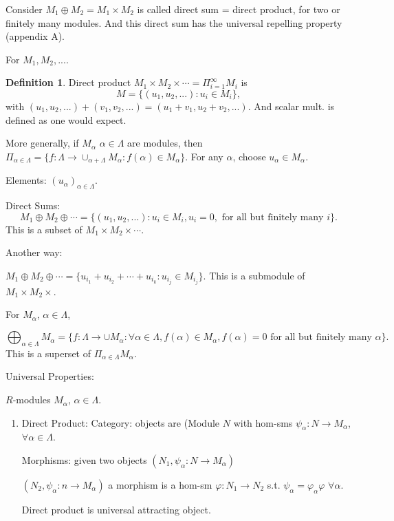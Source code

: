 \documentclass[9pt,reqno,twoside]{amsbook}
\theoremstyle{plain}
\numberwithin{section}{chapter}
\numberwithin{equation}{chapter}
\theoremstyle{definition}
\newtheorem{Def}[theorem]{Definition}
\theoremstyle{remark}
\theoremstyle{plain}
\renewcommand{\phi}{\varphi}
\begin{document}
Consider $M_1 \oplus M_2 = M_1 \times M_2$ is called direct sum = direct product, for two or finitely many modules. And this direct sum has the universal repelling property (appendix A). 

For $M_1,M_2,...$. 

\begin{Def}
Direct product $M_1 \times M_2 \times \cdots = \Pi_{i = 1}^\infty M_i$ is 
$$
M = \{(u_1,u_2,...): u_i \in M_i\},
$$
with $(u_1,u_2,...) + (v_1,v_2,...) = (u_1 + v_1,u_2 + v_2,...)$. And scalar mult. is defined as one would expect. 


\end{Def}

More generally, if $M_\alpha$ $\alpha \in \Lambda$ are modules, then $\Pi_{\alpha \in \Lambda} = \{f: \Lambda \to \cup_{\alpha + \Lambda}M_\alpha: f(\alpha) \in M_\alpha\}$. For any $\alpha$, choose $u_\alpha \in M_\alpha$. 

Elements: $(u_\alpha)_{\alpha \in \Lambda}$. 

Direct Sums: 
$$M_1 \oplus M_2 \oplus \cdots = \{(u_1,u_2,...): u_i \in M_i,u_i = 0, \text{ for all but finitely many } i\}.
$$
 This is a subset of $M_1 \times M_2 \times \cdots$. 

Another way: 

$M_1 \oplus M_2 \oplus \cdots = \{u_{i_1} + u_{i_2} + \cdots + u_{i_k}:u_{i_j} \in M_{i_j}\}$. This is a submodule of $M_1 \times M_2 \times$. 

For $M_\alpha$, $\alpha \in \Lambda$, 

$$
\bigoplus_{\alpha \in \Lambda} M_\alpha = \{f: \Lambda \to \cup M_\alpha: \forall \alpha \in \Lambda, f(\alpha) \in M_\alpha, f(\alpha) = 0 \text{ for all but finitely many } \alpha\}.
$$ 
This is a superset of $\Pi_{\alpha \in \Lambda}M_\alpha$. 

Universal Properties: 

$R$-modules $M_\alpha$, $\alpha \in \Lambda$. 

\begin{enumerate}
\item Direct Product: 
Category: objects are (Module $N$ with hom-sms $\psi_\alpha: N \to M_\alpha$, $\forall \alpha \in \Lambda$. 

Morphisms: given two objects 
$(N_1,\psi_\alpha:N \to M_\alpha)$

$(N_2,\psi_\alpha:n \to M_\alpha)$
a morphism is a hom-sm $\phi: N_1 \to N_2$ 
s.t. $\psi_\alpha = \phi_\alpha \phi$ $\forall \alpha$. 

Direct product is universal attracting object. 
\end{enumerate}
\end{document}
